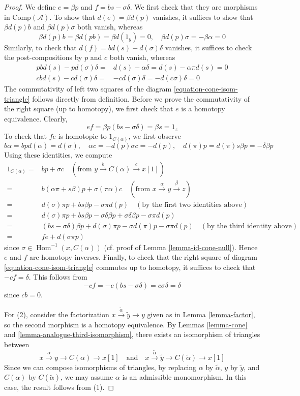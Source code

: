 \documentclass{stacks-project}
\theoremstyle{plain}
\theoremstyle{definition}
\theoremstyle{remark}
\numberwithin{equation}{subsection}
\def\Hom{\mathop{\mathrm{Hom}}\nolimits}
\begin{document}
\begin{proof}
\medskip\noindent
We define $e=\beta p$ and $f=bs-\sigma\delta$. We first check that they are
morphisms in $\text{Comp}(\mathcal{A})$. To show that $d(e)=\beta d(p)$
vanishes, it suffices to show that $\beta d(p)b$ and $\beta d(p)\sigma$
both vanish, whereas
$$
\beta d(p)b = \beta d(pb) = \beta d(1_y) = 0,\quad
\beta d(p)\sigma = -\beta\alpha = 0
$$
Similarly, to check that $d(f)=bd(s)-d(\sigma)\delta$ vanishes,
it suffices to check the post-compositions by $p$ and $c$ both vanish,
whereas
\begin{align*}
pbd(s) - pd(\sigma)\delta
= &
d(s)-\alpha\delta = d(s)-\alpha\pi d(s) = 0 \\
cbd(s)-cd(\sigma)\delta
= &
-cd(\sigma)\delta = -d(c\sigma)\delta = 0
\end{align*}
The commutativity of left two squares of the
diagram \ref{equation-cone-isom-triangle} follows directly from definition.
Before we prove the commutativity of the right square (up to homotopy),
we first check that $e$ is a homotopy equivalence. Clearly,
$$
ef=\beta p (bs-\sigma\delta)=\beta s=1_z
$$
To check that $fe$ is homotopic to $1_{C(\alpha)}$, we first observe
$$
b\alpha = bpd(\alpha) = d(\sigma),\quad
\alpha c = -d(p)\sigma c = -d(p),\quad
d(\pi)p = d(\pi)s\beta p = -\delta\beta p
$$
Using these identities, we compute
\begin{align*}
1_{C(\alpha)} = &
bp + \sigma c
\quad (\text{from }y \xrightarrow{b} C(\alpha) \xrightarrow{c} x[1]) \\
= &
b(\alpha\pi + s\beta)p + \sigma(\pi\alpha)c
\quad (\text{from }x \xrightarrow{\alpha} y \xrightarrow{\beta} z) \\
= &
d(\sigma)\pi p + bs\beta p - \sigma\pi d(p)
\quad (\text{by the first two identities above}) \\
= &
d(\sigma)\pi p + bs\beta p - \sigma\delta\beta p
+ \sigma\delta\beta p - \sigma\pi d(p) \\
= &
(bs - \sigma\delta)\beta p + d(\sigma)\pi p
- \sigma d(\pi)p - \sigma\pi d(p)\quad
(\text{by the third identity above}) \\
= &
fe + d(\sigma \pi p)
\end{align*}
since $\sigma \in \Hom^{-1}(x, C(\alpha))$
(cf. proof of Lemma \ref{lemma-id-cone-null}).
Hence $e$ and $f$ are homotopy inverses.
Finally, to check that the right square of
diagram \ref{equation-cone-isom-triangle} commutes up to homotopy,
it suffices to check that $-cf=\delta$. This follows from
$$
-cf = -c(bs-\sigma\delta) = c\sigma\delta = \delta
$$
since $cb=0$.

\medskip\noindent
For (2), consider the factorization
$x\xrightarrow{\tilde{\alpha}}\tilde{y}\to y$
given as in Lemma \ref{lemma-factor}, so the second morphism
is a homotopy equivalence. By Lemmas \ref{lemma-cone} and
\ref{lemma-analogue-third-isomorphism}, there
exists an isomorphism of triangles between
$$
x \xrightarrow{\alpha} y \to C(\alpha) \to x[1]
\quad\text{and}\quad
x \xrightarrow{\tilde{\alpha}} \tilde{y} \to C(\tilde{\alpha}) \to x[1]
$$
Since we can compose isomorphisms of triangles, by replacing
$\alpha$ by $\tilde{\alpha}$, $y$ by $\tilde{y}$, and $C(\alpha)$ by
$C(\tilde{\alpha})$, we may assume $\alpha$ is an admissible monomorphism.
In this case, the result follows from (1).
\end{proof}
\end{document}
